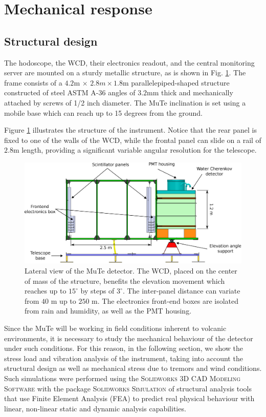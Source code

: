 \documentclass[letterpaper,11pt]{article}
\begin{document}
\section{Mechanical response}
\label{mechanical}
\subsection{Structural design}
The hodoscope, the WCD, their electronics readout, and the central monitoring server are mounted on a sturdy metallic structure, as is shown in Fig. \ref{fig:Structure}. The frame consists of a $4.2$m $\times$ $2.8 m \times 1.8$m parallelepiped-shaped structure constructed of steel ASTM A-36 angles of $3.2$mm thick and mechanically attached by screws of 1/2 inch diameter. The MuTe inclination is set using a mobile base which can reach up to 15 degrees from the ground.

Figure \ref{fig:Structure} illustrates the structure of the instrument. Notice that the rear panel is fixed to one of the walls of the WCD, while the frontal panel can slide on a rail of $2.8$m length, providing a significant variable angular resolution for the telescope. 
\begin{figure}[htb]
\centering
\includegraphics[width=1\columnwidth]{Figures/Detector.eps}
\caption{Lateral view of the MuTe detector. The WCD, placed on the center of mass of the structure, benefits the elevation movement which reaches up to $15^{\circ}$ by steps of $3^{\circ}$. The inter-panel distance can variate from  $40$ m up to $250$ m. The electronics front-end boxes are isolated from rain and humidity, as well as the PMT housing.}
  \label{fig:Structure}
\end{figure}

Since the MuTe will be working in field conditions inherent to volcanic environments,  it is necessary to study the mechanical behaviour of the detector under such conditions. For this reason, in the following section, we show the stress load and vibration analysis of the instrument, taking into account the structural design as well as mechanical stress due to tremors and wind conditions. Such simulations were performed using the \textsc{Solidworks 3D CAD Modeling Software} with the package \textsc{Solidworks Simulation} of structural analysis tools that use Finite Element Analysis (FEA) to predict real physical behaviour with linear, non-linear static and dynamic analysis capabilities.
\end{document}
